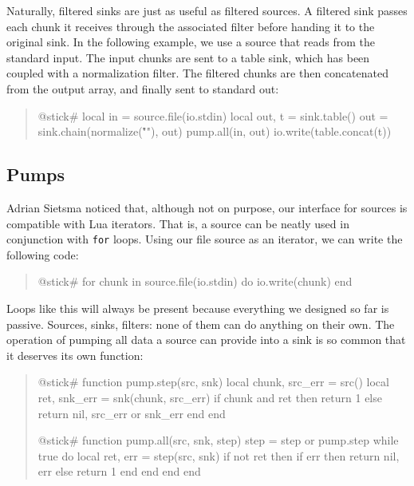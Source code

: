\documentclass[10pt]{article}
\begin{document}
Naturally, filtered sinks are just as useful as filtered
sources. A filtered sink passes each chunk it receives
through the associated filter before handing it to the
original sink.  In the following example, we use a source
that reads from the standard input.  The input chunks are
sent to a table sink, which has been coupled with a
normalization filter.  The filtered chunks are then
concatenated from the output array, and finally sent to
standard out:
\begin{quote}
\begin{lua}
@stick#
local in = source.file(io.stdin)
local out, t = sink.table()
out = sink.chain(normalize("\r\n"), out)
pump.all(in, out)
io.write(table.concat(t))
%
\end{lua}
\end{quote}

\subsection{Pumps}

Adrian Sietsma noticed that, although not on purpose, our 
interface for sources is compatible with Lua iterators. 
That is, a source can be neatly used in conjunction 
with \texttt{for} loops.  Using our file
source as an iterator, we can write the following code:
\begin{quote}
\begin{lua}
@stick#
for chunk in source.file(io.stdin) do
  io.write(chunk)
end
%
\end{lua}
\end{quote}

Loops like this will always be present because everything 
we designed so far is passive. Sources, sinks, filters: none
of them can do anything on their own. The operation of
pumping all data a source can provide into a sink is so
common that it deserves its own function:
\begin{quote}
\begin{lua}
@stick#
function pump.step(src, snk)
  local chunk, src_err = src()
  local ret, snk_err = snk(chunk, src_err)
  if chunk and ret then return 1
  else return nil, src_err or snk_err end
end
%

@stick#
function pump.all(src, snk, step)
    step = step or pump.step
    while true do
        local ret, err = step(src, snk)
        if not ret then
            if err then return nil, err
            else return 1 end
        end 
    end
end
%
\end{lua}
\end{quote}
\end{document}
